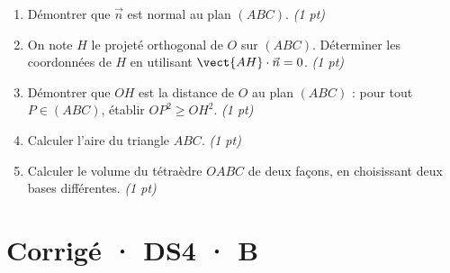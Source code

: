 \begin{enumerate}

\item Démontrer que $\vec n$ est normal au plan $(ABC)$. \hfill\textit{(1 pt)}

\item On note $H$ le projeté orthogonal de $O$ sur $(ABC)$. Déterminer les coordonnées de $H$ en utilisant $\vect{AH}\cdot\vec n=0$. \hfill\textit{(1 pt)}

\item Démontrer que $OH$ est la distance de $O$ au plan $(ABC)$ : pour tout $P\in(ABC)$, établir $OP^2\ge OH^2$. \hfill\textit{(1 pt)}

\item Calculer l'aire du triangle $ABC$. \hfill\textit{(1 pt)}

\item Calculer le volume du tétraèdre $OABC$ de deux façons, en choisissant deux bases différentes. \hfill\textit{(1 pt)}

\end{enumerate}

\ifmxteacher\mxnewpage

\section*{Corrigé · DS4 · B}\label{cor:6-4}

